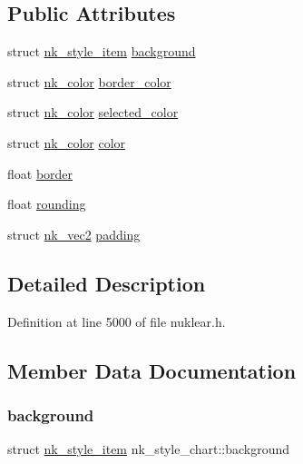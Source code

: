 \subsection*{Public Attributes}
\begin{DoxyCompactItemize}
\item 
struct \mbox{\hyperlink{structnk__style__item}{nk\+\_\+style\+\_\+item}} \mbox{\hyperlink{structnk__style__chart_a45007058d04e5a1dc7611336ccfa4718}{background}}
\item 
struct \mbox{\hyperlink{structnk__color}{nk\+\_\+color}} \mbox{\hyperlink{structnk__style__chart_a1d84173adcc90140b7c12cb5875e716d}{border\+\_\+color}}
\item 
struct \mbox{\hyperlink{structnk__color}{nk\+\_\+color}} \mbox{\hyperlink{structnk__style__chart_ad1227179245ac3164d9e40b05b703926}{selected\+\_\+color}}
\item 
struct \mbox{\hyperlink{structnk__color}{nk\+\_\+color}} \mbox{\hyperlink{structnk__style__chart_ae9971b19eeb2b59cb81898f11cb56467}{color}}
\item 
float \mbox{\hyperlink{structnk__style__chart_a47ac4908b7c4d442e6e23c1b167c8a9e}{border}}
\item 
float \mbox{\hyperlink{structnk__style__chart_a178316102e8723bef6ba2c7e6c8ba0ed}{rounding}}
\item 
struct \mbox{\hyperlink{structnk__vec2}{nk\+\_\+vec2}} \mbox{\hyperlink{structnk__style__chart_aa74537263211d6e2202e82e2e2bb3052}{padding}}
\end{DoxyCompactItemize}


\subsection{Detailed Description}


Definition at line 5000 of file nuklear.\+h.



\subsection{Member Data Documentation}
\mbox{\label{structnk__style__chart_a45007058d04e5a1dc7611336ccfa4718}} 
\subsubsection{\texorpdfstring{background}{background}}
{\footnotesize\ttfamily struct \mbox{\hyperlink{structnk__style__item}{nk\+\_\+style\+\_\+item}} nk\+\_\+style\+\_\+chart\+::background}



